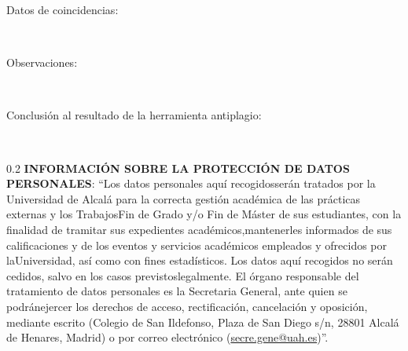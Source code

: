\begin{description}
  \item[Datos de coincidencias:] ~
        \vspace{3.5cm}
  \item[Observaciones:] ~
        \vspace{3.5cm}
  \item[Conclusión al resultado de la herramienta antiplagio:] ~
        \vspace{4cm}
\end{description}

\begin{spacing}{0.2}
{\footnotesize \noindent \textbf{INFORMACIÓN SOBRE LA PROTECCIÓN DE DATOS PERSONALES}: ``Los datos personales aquí recogidosserán tratados por la Universidad de Alcalá para la correcta gestión académica de las prácticas externas y los TrabajosFin de Grado y/o Fin de Máster de sus estudiantes, con la finalidad de tramitar sus expedientes académicos,mantenerles informados de sus calificaciones y de los eventos y servicios académicos empleados y ofrecidos por laUniversidad, así como con fines estadísticos. Los datos aquí recogidos no serán cedidos, salvo en los casos previstoslegalmente. El órgano responsable del tratamiento de datos personales es la Secretaria General, ante quien se podránejercer los derechos de acceso, rectificación, cancelación y oposición, mediante escrito (Colegio de San Ildefonso, Plaza de San Diego s/n, 28801 Alcalá de Henares, Madrid) o por correo electrónico (\href{secre.gene@uah.es}{secre.gene@uah.es})''.}
\end{spacing}

